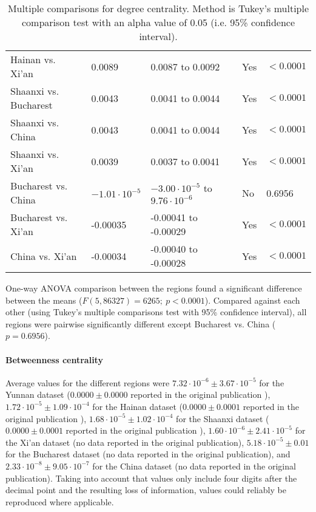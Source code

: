 \begin{table}[h]
\begin{mdframed}
\begin{tabular*}{\linewidth}{l|llll}
			Hainan vs. Xi'an & 0.0089 & 0.0087 to 0.0092 & Yes & $<0.0001$\\
			Shaanxi vs. Bucharest & 0.0043 & 0.0041 to 0.0044 & Yes & $<0.0001$\\
			Shaanxi vs. China & 0.0043 & 0.0041 to 0.0044 & Yes & $<0.0001$\\
			Shaanxi vs. Xi'an & 0.0039 & 0.0037 to 0.0041 & Yes & $<0.0001$\\
			Bucharest vs. China & $-1.01\cdot 10^{-5}$ & $-3.00\cdot 10^{-5}$ to $9.76\cdot 10^{-6}$ & No & 0.6956\\
			Bucharest vs. Xi'an & -0.00035 & -0.00041 to -0.00029 & Yes & $<0.0001$\\
			China vs. Xi'an & -0.00034 & -0.00040 to -0.00028 & Yes & $<0.0001$\\
			\hline
		\end{tabular*}
		\caption{Multiple comparisons for degree centrality. Method is Tukey's multiple comparison test with an alpha value of 0.05 (i.e. 95\% confidence interval).}
		\label{tab:degree_centrality_tukey}
	\end{mdframed}
\end{table}

One-way ANOVA comparison between the regions found a significant difference between the means ($F(5,86327) = 6265; \: p<0.0001$). Compared against each other (using Tukey's multiple comparisons test with 95\% confidence interval), all regions were pairwise significantly different except Bucharest vs. China ($p=0.6956$).

\paragraph{Betweenness centrality} Average values for the different regions were $7.32\cdot 10^{-6}\pm3.67\cdot 10^{-5}$ for the Yunnan dataset ($0.0000\pm0.0000$ reported in the original publication \cite{hainan_publication}), $1.72\cdot 10^{-5}\pm1.09\cdot 10^{-4}$ for the Hainan dataset ($0.0000\pm0.0001$ reported in the original publication \cite{hainan_publication}), $1.68\cdot 10^{-5}\pm1.02\cdot 10^{-4}$ for the Shaanxi dataset ($0.0000\pm0.0001$ reported in the original publication \cite{shaanxi_publication}), $1.60\cdot 10^{-6}\pm2.41\cdot 10^{-5}$ for the Xi'an dataset (no data reported in the original publication), $5.18\cdot 10^{-5}\pm0.01$ for the Bucharest dataset (no data reported in the original publication), and $2.33\cdot 10^{-8}\pm9.05\cdot 10^{-7}$ for the China dataset (no data reported in the original publication). Taking into account that values only include four digits after the decimal point and the resulting loss of information, values could reliably be reproduced where applicable.

